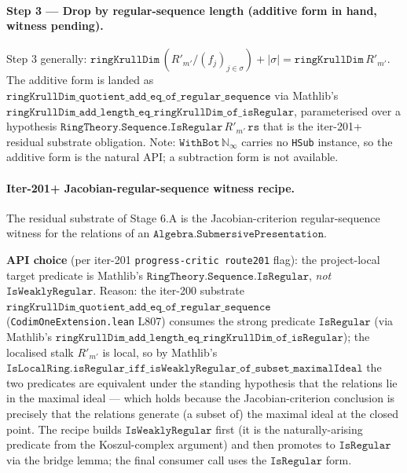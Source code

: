 \paragraph{Step 3 --- Drop by regular-sequence length (additive form
in hand, witness pending).} Step 3 generally:
\(\texttt{ringKrullDim}\,(R'_{m'} / (f_j)_{j \in \sigma}) +
 |\sigma| = \texttt{ringKrullDim}\,R'_{m'}\). The additive form is
landed as
\(\texttt{ringKrullDim\_quotient\_add\_eq\_of\_regular\_sequence}\)
via Mathlib's
\(\texttt{ringKrullDim\_add\_length\_eq\_ringKrullDim\_of\_isRegular}\),
parameterised over a hypothesis
\(\texttt{RingTheory.Sequence.IsRegular}\,R'_{m'}\,\texttt{rs}\)
that is the iter-201+ residual substrate obligation. Note:
\(\texttt{WithBot}\,\mathbb N_\infty\) carries no \texttt{HSub}
instance, so the additive form is the natural API; a subtraction
form is not available.

\paragraph{Iter-201+ Jacobian-regular-sequence witness recipe.} The
residual substrate of Stage 6.A is the Jacobian-criterion
regular-sequence witness for the relations of an
\(\texttt{Algebra.SubmersivePresentation}\).

\textbf{API choice} (per iter-201 \texttt{progress-critic route201}
flag): the project-local target predicate is Mathlib's
\(\texttt{RingTheory.Sequence.IsRegular}\), \emph{not}
\(\texttt{IsWeaklyRegular}\). Reason: the iter-200 substrate
\(\texttt{ringKrullDim\_quotient\_add\_eq\_of\_regular\_sequence}\)
(\texttt{CodimOneExtension.lean} L807) consumes the strong predicate
\(\texttt{IsRegular}\) (via Mathlib's
\(\texttt{ringKrullDim\_add\_length\_eq\_ringKrullDim\_of\_isRegular}\));
the localised stalk \(R'_{m'}\) is local, so by Mathlib's
\(\texttt{IsLocalRing.isRegular\_iff\_isWeaklyRegular\_of\_subset\_maximalIdeal}\)
the two predicates are equivalent under the standing hypothesis that
the relations lie in the maximal ideal --- which holds because
the Jacobian-criterion conclusion is precisely that the relations
generate (a subset of) the maximal ideal at the closed point. The
recipe builds \(\texttt{IsWeaklyRegular}\) first (it is the
naturally-arising predicate from the Koszul-complex argument) and
then promotes to \(\texttt{IsRegular}\) via the bridge lemma; the
final consumer call uses the \(\texttt{IsRegular}\) form.


